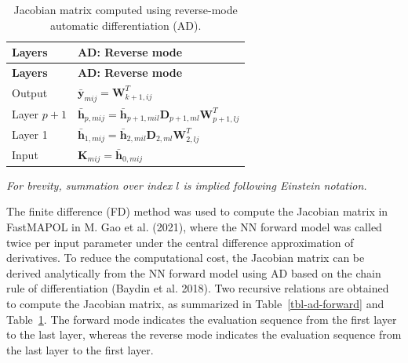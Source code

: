 \documentclass[
  letterpaper,
  open=any]{scrbook}
\begin{document}
\begin{longtable}[]{@{}
  >{\raggedright\arraybackslash}p{}
  >{\raggedright\arraybackslash}p{}@{}}
\caption{Jacobian matrix computed using reverse-mode automatic
differentiation (AD).}\label{tbl-ad-reverse}\tabularnewline
\toprule\noalign{}
\begin{minipage}[b]{\linewidth}\raggedright
\textbf{Layers}
\end{minipage} & \begin{minipage}[b]{\linewidth}\raggedright
\textbf{AD: Reverse mode}
\end{minipage} \\
\midrule\noalign{}
\endfirsthead
\toprule\noalign{}
\begin{minipage}[b]{\linewidth}\raggedright
\textbf{Layers}
\end{minipage} & \begin{minipage}[b]{\linewidth}\raggedright
\textbf{AD: Reverse mode}
\end{minipage} \\
\midrule\noalign{}
\endhead
\bottomrule\noalign{}
\endlastfoot
Output & \(\bar{\mathbf{y}}_{mij}=\mathbf{W}_{k+1,ij}^T\) \\
Layer \(p+1\) &
\(\bar{\mathbf{h}}_{p,mij}=\bar{\mathbf{h}}_{p+1,mil}\mathbf{D}_{p+1,ml}\mathbf{W}_{p+1,lj}^T\) \\
Layer 1 &
\(\bar{\mathbf{h}}_{1,mij}=\bar{\mathbf{h}}_{2,mil}\mathbf{D}_{2,ml}\mathbf{W}_{2,lj}^T\) \\
Input & \(\mathbf{K}_{mij}=\bar{\mathbf{h}}_{0,mij}\) \\
\end{longtable}

\emph{For brevity, summation over index \(l\) is implied following
Einstein notation.}

The finite difference (FD) method was used to compute the Jacobian
matrix in FastMAPOL in M. Gao et al. (2021), where the NN forward model
was called twice per input parameter under the central difference
approximation of derivatives. To reduce the computational cost, the
Jacobian matrix can be derived analytically from the NN forward model
using AD based on the chain rule of differentiation (Baydin et al.
2018). Two recursive relations are obtained to compute the Jacobian
matrix, as summarized in Table~\ref{tbl-ad-forward} and
Table~\ref{tbl-ad-reverse}. The forward mode indicates the evaluation
sequence from the first layer to the last layer, whereas the reverse
mode indicates the evaluation sequence from the last layer to the first
layer.
\end{document}
